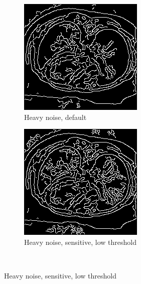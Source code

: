 \begin{figure}[H]
  \centering
  
  \begin{subfigure}{.5\textwidth}
    \centering
    \includegraphics[width=.9\textwidth]{./edgedetection/heavy_noise/h_noise_def}
    \caption{Heavy noise, default}
    \label{fig:h_noise_def}
  \end{subfigure}%
  
  \begin{subfigure}{.5\textwidth}
    \centering
    \includegraphics[width=.9\textwidth]{./edgedetection/heavy_noise/h_noise_sens_l_thres}
    \caption{Heavy noise, sensitive, low threshold}
    \label{fig:h_noise_sens_l_thres}
  \end{subfigure}\\%
  

\end{figure}
